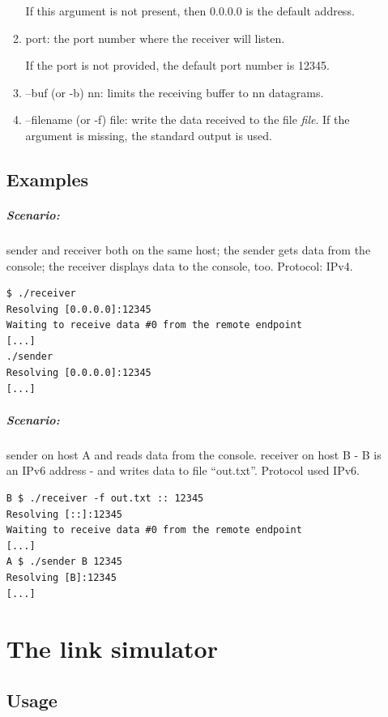 \documentclass[12pt]{book}
\begin{document}
\begin{enumerate}[label=\arabic*.]
\begin{enumerate}
  If this argument is not present, then 0.0.0.0 is the default address.
  
\item port: the port number where the receiver will listen.

  If the port is not provided, the default port number is 12345.
\item --buf (or -b) nn: limits the receiving buffer to nn datagrams.
  \item --filename (or -f) file: write the data received to the file \emph{file}. If the argument is missing, the standard output is used. 
\end{enumerate}


\section{Examples}

\paragraph{Scenario:} sender and receiver both on the same host; the sender gets data from the console; the receiver displays data to the console, too. Protocol: IPv4.

\begin{verbatim}
$ ./receiver
Resolving [0.0.0.0]:12345
Waiting to receive data #0 from the remote endpoint
[...]
./sender 
Resolving [0.0.0.0]:12345
[...]
\end{verbatim}

\paragraph{Scenario:} sender on host A and reads data from the console. receiver on host B - B is an IPv6 address - and writes data to file ``out.txt''. Protocol used IPv6.

\begin{verbatim}
B $ ./receiver -f out.txt :: 12345
Resolving [::]:12345
Waiting to receive data #0 from the remote endpoint
[...]
A $ ./sender B 12345
Resolving [B]:12345
[...]
\end{verbatim}


\chapter{The link simulator}

\section{Usage}


\end{enumerate}
\end{document}
